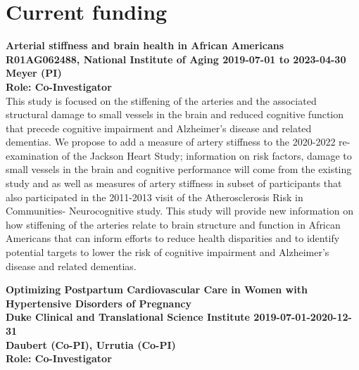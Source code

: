 \documentclass[10pt,letterpaper]{article}
\renewenvironment{itemize}{
  \begin{list}{}{
    \setlength{\leftmargin}{1.5em}
    \setlength{\itemsep}{0.25em}
    \setlength{\parskip}{0pt}
    \setlength{\parsep}{0.25em}
  }
}{
  \end{list}
}
\begin{document}
\section*{Current funding}
\begin{itemize}
    \item \textbf{Arterial stiffness and brain health in African Americans \\ R01AG062488, National Institute of Aging 2019-07-01 to 2023-04-30 \\
    Meyer (PI)\\
    Role: Co-Investigator}\\
    This study is focused on the stiffening of the arteries and the associated structural damage to small vessels in the brain and reduced cognitive function that precede cognitive impairment and Alzheimer's disease and related dementias. We propose to add a measure of artery stiffness to the 2020-2022 re-examination of the Jackson Heart Study; information on risk factors, damage to small vessels in the brain and cognitive performance will come from the existing study and as well as measures of artery stiffness in subset of participants that also participated in the 2011-2013 visit of the Atherosclerosis Risk in Communities- Neurocognitive study. This study will provide new information on how stiffening of the arteries relate to brain structure and function in African Americans that can inform efforts to reduce health disparities and to identify potential targets to lower the risk of cognitive impairment and Alzheimer's disease and related dementias.\\
    
    \item \textbf{Optimizing Postpartum Cardiovascular Care in Women with Hypertensive Disorders of Pregnancy \\ Duke Clinical and Translational Science Institute 2019-07-01-2020-12-31\\  Daubert (Co-PI), Urrutia (Co-PI)\\ 
    Role: Co-Investigator}

\end{itemize}
\end{document}
